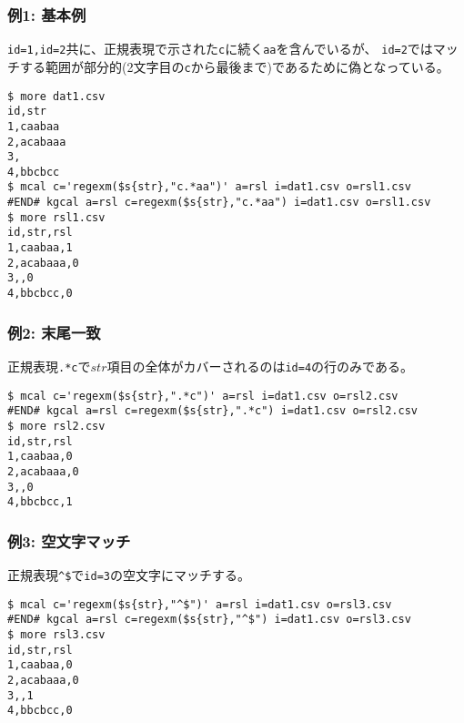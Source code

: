 \subsubsection*{例1: 基本例}

\verb|id=1,id=2|共に、正規表現で示された\verb|c|に続く\verb|aa|を含んでいるが、
\verb|id=2|ではマッチする範囲が部分的(2文字目の\verb|c|から最後まで)であるために偽となっている。


\begin{Verbatim}[baselinestretch=0.7,frame=single]
$ more dat1.csv
id,str
1,caabaa
2,acabaaa
3,
4,bbcbcc
$ mcal c='regexm($s{str},"c.*aa")' a=rsl i=dat1.csv o=rsl1.csv
#END# kgcal a=rsl c=regexm($s{str},"c.*aa") i=dat1.csv o=rsl1.csv
$ more rsl1.csv
id,str,rsl
1,caabaa,1
2,acabaaa,0
3,,0
4,bbcbcc,0
\end{Verbatim}
\subsubsection*{例2: 末尾一致}

正規表現\verb|.*c|で$str$項目の全体がカバーされるのは\verb|id=4|の行のみである。


\begin{Verbatim}[baselinestretch=0.7,frame=single]
$ mcal c='regexm($s{str},".*c")' a=rsl i=dat1.csv o=rsl2.csv
#END# kgcal a=rsl c=regexm($s{str},".*c") i=dat1.csv o=rsl2.csv
$ more rsl2.csv
id,str,rsl
1,caabaa,0
2,acabaaa,0
3,,0
4,bbcbcc,1
\end{Verbatim}
\subsubsection*{例3: 空文字マッチ}

正規表現\verb|^$|で\verb|id=3|の空文字にマッチする。


\begin{Verbatim}[baselinestretch=0.7,frame=single]
$ mcal c='regexm($s{str},"^$")' a=rsl i=dat1.csv o=rsl3.csv
#END# kgcal a=rsl c=regexm($s{str},"^$") i=dat1.csv o=rsl3.csv
$ more rsl3.csv
id,str,rsl
1,caabaa,0
2,acabaaa,0
3,,1
4,bbcbcc,0
\end{Verbatim}
